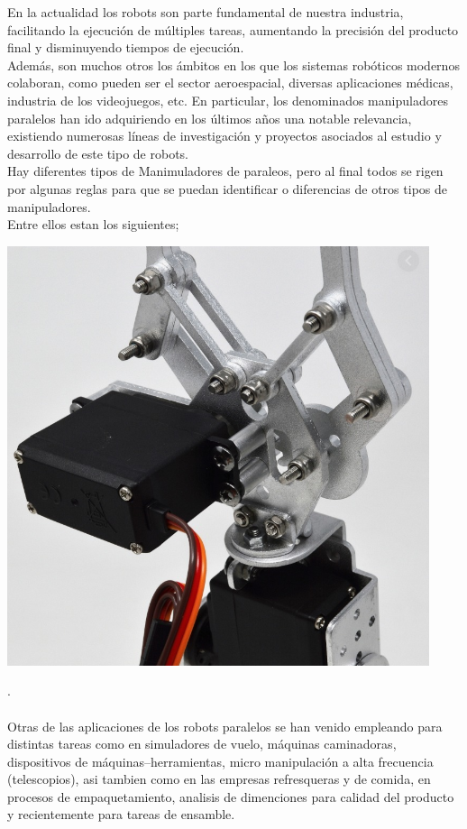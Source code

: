 \documentclass[12pt,a4paper]{article}
\begin{document}
En la actualidad los robots son parte fundamental de nuestra industria, facilitando la ejecución de múltiples tareas, aumentando la precisión del producto final y disminuyendo tiempos de ejecución.\\ Además, son muchos otros los ámbitos en los que los sistemas robóticos modernos colaboran, como pueden ser el sector aeroespacial, diversas aplicaciones médicas, industria de los videojuegos, etc. En particular, los denominados manipuladores paralelos han ido adquiriendo en los últimos años una notable relevancia, existiendo numerosas líneas de investigación y proyectos asociados al estudio y desarrollo de este tipo de robots.\\

Hay diferentes tipos de Manimuladores de paraleos, pero al final todos se rigen por algunas reglas para que se puedan identificar o diferencias de otros tipos de manipuladores.\\
Entre ellos estan los siguientes; \\
\begin{center}
\includegraphics[scale=1.15]{1.PNG}
\end{center}
.\\\\
Otras de las aplicaciones de los robots paralelos se han venido empleando para distintas tareas como en simuladores de vuelo, máquinas caminadoras, dispositivos de máquinas–herramientas, micro manipulación a alta frecuencia (telescopios), asi tambien como en las empresas refresqueras y de comida, en procesos de empaquetamiento, analisis de dimenciones para calidad del producto y recientemente para tareas de ensamble.
\end{document}

